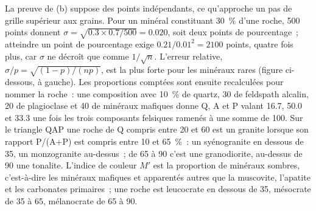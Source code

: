 La preuve de (b) suppose des points indépendants, ce qu'approche un pas de grille supérieur aux grains.
Pour un minéral constituant \qty{30}{\percent} d'une roche, 500 points donnent $\sigma =
\sqrt{0.3 \times 0.7/500} = 0.020$, soit deux points de pourcentage~; atteindre un point de pourcentage exige
$0.21/0.01^2 = 2100$ points, quatre fois plus, car $\sigma$ ne décroît que comme $1/\sqrt n$. L'erreur
relative, $\sigma/p = \sqrt{(1-p)/(np)}$, est la plus forte pour les minéraux rares (figure ci-dessous,
à gauche). Les proportions comptées sont ensuite recalculées pour nommer la roche~: une composition avec
\qty{10}{\percent} de quartz, 30 de feldspath alcalin, 20 de plagioclase et 40 de minéraux mafiques donne Q, A et
P valant 16.7, 50.0 et 33.3 une fois les trois composants felsiques ramenés à une somme de 100. Sur le triangle QAP
une roche de Q compris entre 20 et 60 est un granite lorsque son rapport P/(A+P) est compris entre 10 et
\qty{65}{\percent}~: un syénogranite en dessous de 35, un monzogranite au-dessus~; de 65 à 90 c'est une
granodiorite, au-dessus de 90 une tonalite. L'indice de couleur $M'$ est la proportion de minéraux sombres, c'est-à-dire
les minéraux mafiques et apparentés autres que la muscovite, l'apatite et les carbonates primaires~; une roche est
leucocrate en dessous de 35, mésocrate de 35 à 65, mélanocrate de 65 à 90.


